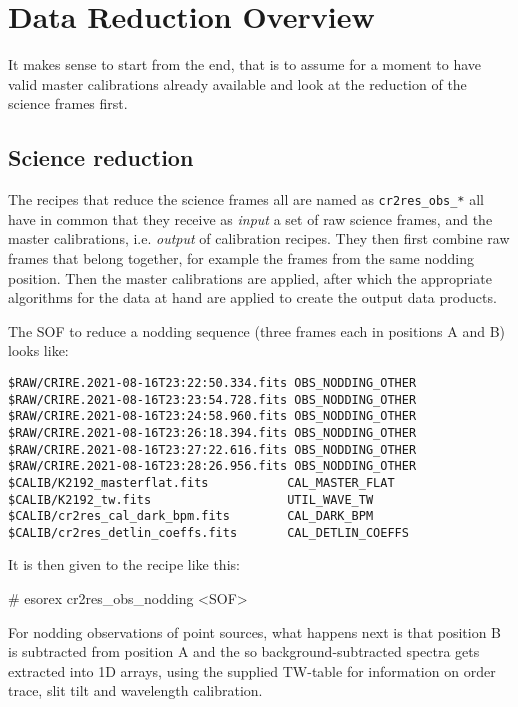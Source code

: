 \section{Data Reduction Overview}
\label{sec:overview}

It makes sense to start from the end, that is to assume for a moment to
have valid master calibrations already available and look at the reduction of
the science frames first.

\subsection{Science reduction}
\label{sec:sci-reduc}

The recipes that reduce the science frames all are named as
\texttt{cr2res\_obs\_*}
all have in common that they receive as \textit{input} a set of raw science
frames, and the master calibrations, i.e. \textit{output} of calibration
recipes. They then first combine raw frames that belong together, for example
the frames from the same nodding position. Then the master calibrations are
applied, after which the appropriate algorithms for the data at hand are applied
to create the output data products.

The SOF to reduce a nodding sequence (three frames  each in positions A and B)
looks like:
\begin{verbatim}
$RAW/CRIRE.2021-08-16T23:22:50.334.fits OBS_NODDING_OTHER
$RAW/CRIRE.2021-08-16T23:23:54.728.fits OBS_NODDING_OTHER
$RAW/CRIRE.2021-08-16T23:24:58.960.fits OBS_NODDING_OTHER
$RAW/CRIRE.2021-08-16T23:26:18.394.fits OBS_NODDING_OTHER
$RAW/CRIRE.2021-08-16T23:27:22.616.fits OBS_NODDING_OTHER
$RAW/CRIRE.2021-08-16T23:28:26.956.fits OBS_NODDING_OTHER
$CALIB/K2192_masterflat.fits           CAL_MASTER_FLAT
$CALIB/K2192_tw.fits                   UTIL_WAVE_TW
$CALIB/cr2res_cal_dark_bpm.fits        CAL_DARK_BPM
$CALIB/cr2res_detlin_coeffs.fits       CAL_DETLIN_COEFFS
\end{verbatim}

It is then given to the recipe like this:
\begin{shell}
    # esorex cr2res_obs_nodding <SOF>
\end{shell}

For nodding observations of point sources, what happens next is that
position B is subtracted from position A and the so background-subtracted
spectra gets extracted into 1D arrays, using the supplied TW-table
for information on order trace, slit tilt and wavelength calibration.

